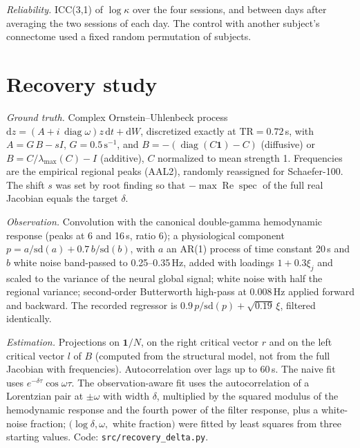 \documentclass[aip,cha,reprint,amsmath,amssymb]{revtex4-2}
\theoremstyle{remark}
\newcommand{\one}{\mathbf 1}
\newcommand{\diag}{\operatorname{diag}}
\begin{document}
\emph{Reliability.} ICC(3,1) of $\log\kappa$ over the four sessions, and between days after averaging the two sessions of each day. The control with another subject's connectome used a fixed random permutation of subjects.

\section{Recovery study}\label{app:recovery}

\emph{Ground truth.} Complex Ornstein--Uhlenbeck process $\mathrm dz=(A+i\,\diag\omega)z\,\mathrm dt+\mathrm dW$, discretized exactly at $\mathrm{TR}=0.72$\,s, with $A=G\,B-sI$, $G=0.5\,\mathrm s^{-1}$, and $B=-(\diag(C\one)-C)$ (diffusive) or $B=C/\lambda_{\max}(C)-I$ (additive), $C$ normalized to mean strength 1. Frequencies are the empirical regional peaks (AAL2), randomly reassigned for Schaefer-100. The shift $s$ was set by root finding so that $-\max\operatorname{Re}\operatorname{spec}$ of the full real Jacobian equals the target $\delta$.

\emph{Observation.} Convolution with the canonical double-gamma hemodynamic response (peaks at 6 and 16\,s, ratio 6); a physiological component $p=a/\mathrm{sd}(a)+0.7\,b/\mathrm{sd}(b)$, with $a$ an AR(1) process of time constant 20\,s and $b$ white noise band-passed to 0.25--0.35\,Hz, added with loadings $1+0.3\xi_j$ and scaled to the variance of the neural global signal; white noise with half the regional variance; second-order Butterworth high-pass at 0.008\,Hz applied forward and backward. The recorded regressor is $0.9\,p/\mathrm{sd}(p)+\sqrt{0.19}\,\xi$, filtered identically.

\emph{Estimation.} Projections on $\one/N$, on the right critical vector $r$ and on the left critical vector $l$ of $B$ (computed from the structural model, not from the full Jacobian with frequencies). Autocorrelation over lags up to 60\,s. The naive fit uses $e^{-\delta\tau}\cos\omega\tau$. The observation-aware fit uses the autocorrelation of a Lorentzian pair at $\pm\omega$ with width $\delta$, multiplied by the squared modulus of the hemodynamic response and the fourth power of the filter response, plus a white-noise fraction; $(\log\delta,\omega,$ white fraction$)$ were fitted by least squares from three starting values. Code: \texttt{src/recovery\_delta.py}.


\end{document}
